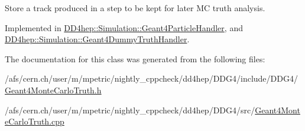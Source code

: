 Store a track produced in a step to be kept for later MC truth analysis. 



Implemented in \hyperlink{class_d_d4hep_1_1_simulation_1_1_geant4_particle_handler_a7a351cfb66cc4e50b9f184b2e80855f4}{D\+D4hep\+::\+Simulation\+::\+Geant4\+Particle\+Handler}, and \hyperlink{class_d_d4hep_1_1_simulation_1_1_geant4_dummy_truth_handler_a0387d2cf651a83c45242962f80c41096}{D\+D4hep\+::\+Simulation\+::\+Geant4\+Dummy\+Truth\+Handler}.



The documentation for this class was generated from the following files\+:\begin{DoxyCompactItemize}
\item 
/afs/cern.\+ch/user/m/mpetric/nightly\+\_\+cppcheck/dd4hep/\+D\+D\+G4/include/\+D\+D\+G4/\hyperlink{_geant4_monte_carlo_truth_8h}{Geant4\+Monte\+Carlo\+Truth.\+h}\item 
/afs/cern.\+ch/user/m/mpetric/nightly\+\_\+cppcheck/dd4hep/\+D\+D\+G4/src/\hyperlink{_geant4_monte_carlo_truth_8cpp}{Geant4\+Monte\+Carlo\+Truth.\+cpp}\end{DoxyCompactItemize}
